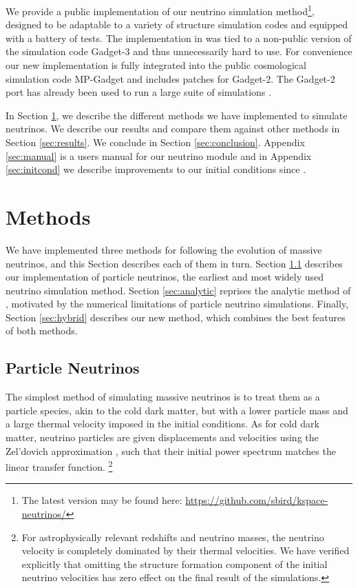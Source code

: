 \documentclass[useAMS, usenatbib]{mnras}
\begin{document}
We provide a public implementation of our neutrino simulation method\footnote{The latest version may be found here: \url{https://github.com/sbird/kspace-neutrinos/}},
designed to be adaptable to a variety of structure simulation codes and equipped with a battery of tests.
The implementation in \cite{AHB} was tied to a non-public version of the simulation code Gadget-3 \cite{Springel_2005} and thus unnecessarily hard to use.
For convenience our new implementation is fully integrated into the public cosmological simulation code MP-Gadget \cite{Feng_2016} and includes patches for Gadget-2.
The Gadget-2 port has already been used to run a large suite of simulations \citep{Liu_2017}.

In Section \ref{sec:methods}, we describe the different methods we have implemented to simulate neutrinos. We describe our
results and compare them against other methods in Section \ref{sec:results}. We conclude in Section \ref{sec:conclusion}. Appendix \ref{sec:manual} is a users manual for our neutrino module and in Appendix \ref{sec:initcond} we describe improvements to our initial conditions since \cite{AHB}.

\section{Methods}
\label{sec:methods}

We have implemented three methods for following the evolution of massive neutrinos, and this Section describes each of them in turn. Section \ref{sec:particle} describes our implementation of particle neutrinos, the earliest and most widely used neutrino simulation method. Section \ref{sec:analytic} reprises the analytic method of \cite{AHB}, motivated by the numerical limitations of particle neutrino simulations. Finally, Section \ref{sec:hybrid} describes our new method, which combines the best features of both methods.

\subsection{Particle Neutrinos}
\label{sec:particle}

The simplest method of simulating massive neutrinos is to treat them as a particle species, akin
to the cold dark matter, but with a lower particle mass and a large thermal velocity imposed
in the initial conditions. As for cold dark matter, neutrino particles are given displacements and velocities using the Zel'dovich approximation \citep{Zeldovich_1970}, such that their initial power spectrum matches the linear transfer function. \footnote{For astrophysically relevant redshifts and neutrino masses, the neutrino velocity is completely dominated by their thermal velocities. We have verified explicitly that omitting the structure formation component of the initial neutrino velocities has zero effect on the final result of the simulations.}
\end{document}
